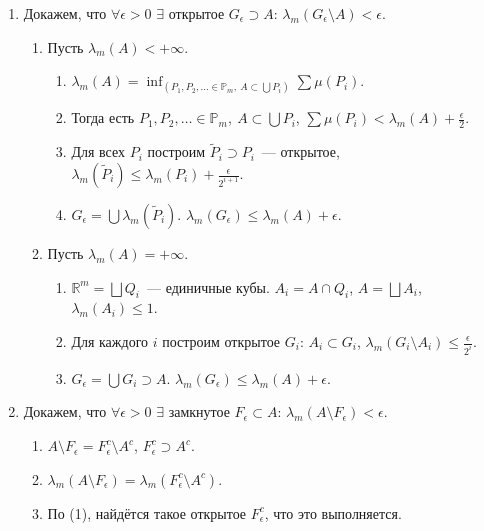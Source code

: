 \documentclass[paper=a4, fontsize=11pt]{article}
\begin{document}
\begin{enumerate}
    \item Докажем, что $\forall \epsilon > 0$ $\exists$ открытое $G_\epsilon \supset A$: $\lambda_m(G_\epsilon \setminus A) < \epsilon$.
    \begin{enumerate}
        \item Пусть $\lambda_m(A) < +\infty$.
        \begin{enumerate}
            \item $\lambda_m(A) = \inf_{(P_1,P_2,\dots \in \mathds{P}_m,\ A \subset \bigcup P_i)} \sum \mu(P_i)$.
            \item Тогда есть $P_1,P_2,\dots \in \mathds{P}_m,\ A \subset \bigcup P_i$,
            $\sum \mu(P_i) < \lambda_m(A) + \frac{\epsilon}{2}$.
            \item Для всех $P_i$ построим $\widetilde{P}_i \supset P_i$~--- открытое,
            $\lambda_m(\widetilde{P}_i) \leq \lambda_m(P_i) + \frac{\epsilon}{2^{i+1}}$.
            \item $G_\epsilon = \bigcup \lambda_m(\widetilde{P}_i)$. $\lambda_m(G_\epsilon) \leq \lambda_m(A) + \epsilon$.
        \end{enumerate}
        \item Пусть $\lambda_m(A) = +\infty$.
        \begin{enumerate}
            \item $\mathds{R}^m = \bigsqcup Q_i$~--- единичные кубы. $A_i = A \cap Q_i$, $A = \bigsqcup A_i$, $\lambda_m(A_i) \leq 1$.
            \item Для каждого $i$ построим открытое $G_i$: $A_i \subset G_i$, $\lambda_m(G_i \setminus A_i) \leq
            \frac{\epsilon}{2^i}$.
            \item $G_\epsilon = \bigcup G_i \supset A$. $\lambda_m(G_\epsilon) \leq \lambda_m(A) + \epsilon$.
        \end{enumerate}
    \end{enumerate}
    \item Докажем, что $\forall \epsilon > 0$ $\exists$ замкнутое $F_\epsilon \subset A$: $\lambda_m(A \setminus F_\epsilon) < \epsilon$.
    \begin{enumerate}
        \item $A \setminus F_\epsilon = F_\epsilon^c \setminus A^c$, $F_\epsilon^c \supset A^c$.
        \item $\lambda_m(A \setminus F_\epsilon) = \lambda_m(F_\epsilon^c \setminus A^c)$.
        \item По (1), найдётся такое открытое $F_\epsilon^c$, что это выполняется.

\end{enumerate}
\end{enumerate}
\end{document}
